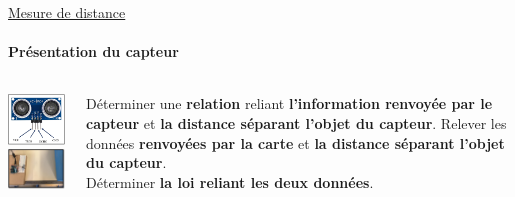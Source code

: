 \documentclass[french, handout]{beamer}
\begin{document}
            \begin{frame}{\hyperlink{pres_capteurs}{Mesure de distance}}
            \framesubtitle{\quad Présentation du capteur}
                    \begin{columns}[c]
                        \hspace{-1.2cm}
                        \begin{column}{4cm}
                            \includegraphics[width=4.7cm]{capteur_distance.png}\\
                            \includegraphics[width=4.75cm]{distance.jpg}
                        \end{column}
                        \begin{column}{5cm}
                            \begin{tcolorbox}[text width = 5cm, colback=gray!5!white,colframe=gray!75!black, title=Objectif et protocole]
                                    \quad Déterminer une \textbf{relation} reliant \textbf{l’information renvoyée par le capteur} et \textbf{la distance séparant l’objet du capteur}.
                                    \tcblower
                                    \quad Relever les données \textbf{renvoyées par la carte} et \textbf{la distance séparant l’objet du capteur}.\\
                                    \quad Déterminer \textbf{la loi reliant les deux données}. 
                            \end{tcolorbox}
                        \end{column}
                    \end{columns}
            \end{frame}
\end{document}
